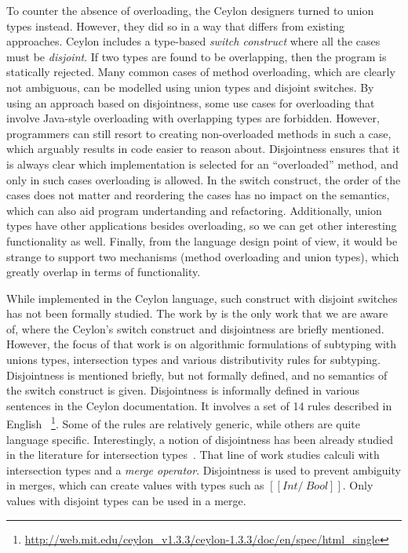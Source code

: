To counter the absence of overloading, the Ceylon designers turned to
union types instead. However, they did so in a way that differs from
existing approaches. Ceylon includes a type-based 
\emph{switch construct} where all the cases must be \emph{disjoint}.  If
two types are found to be overlapping, then the program is statically
rejected. Many common cases of method overloading, which are clearly
not ambiguous, can be modelled using union types and disjoint switches.
By using an approach based on disjointness, some use cases for
overloading that involve Java-style overloading with
overlapping types are forbidden. However,
programmers can still resort to creating non-overloaded methods in
such a case, which arguably results in code easier to reason about.
Disjointness ensures that it is always
clear which implementation is selected for an ``overloaded'' method,
and only in such cases overloading is allowed.
In the switch construct,
the order of the cases does not matter and reordering the cases has no
impact on the semantics, which can also aid program undertanding and
refactoring.
Additionally, union types have other applications besides overloading,
so we can get other interesting functionality as well. Finally, from
the language design point of view, it would be strange to support two
mechanisms (method overloading and union types), which greatly overlap
in terms of functionality.

While implemented in the Ceylon language, such construct
with disjoint switches has not been formally studied.
The work by \citet{muehlboeck2018empowering} is the only work that we are aware of,
where the Ceylon's switch construct
and disjointness are briefly mentioned. However, the focus 
of that work is on algorithmic formulations of subtyping
with unions types, intersection types and various distributivity
rules for subtyping. Disjointness is mentioned briefly, but not
formally defined, and no semantics of the switch construct is given.
Disjointness is informally defined in various sentences in the
Ceylon documentation. It involves a set of 14 rules described in English
~\footnote{\url{http://web.mit.edu/ceylon_v1.3.3/ceylon-1.3.3/doc/en/spec/html_single}}. Some of the rules are relatively generic, while
others are quite language specific. Interestingly, a notion
of disjointness has been already studied in the literature
for intersection types~\cite{oliveira2016disjoint}. That line of work studies calculi
with intersection types and a \textit{merge operator}. Disjointness
is used to prevent ambiguity in merges, which can create
values with types such as $[[Int /\ Bool]]$. Only values
with disjoint types can be used in a merge.

